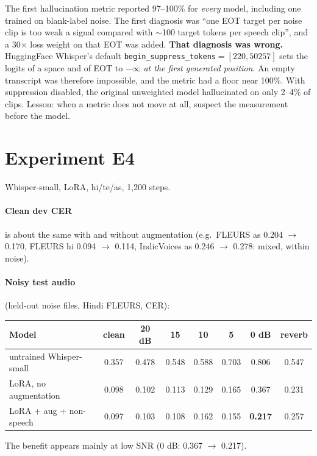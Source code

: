 \begin{vivatip}
The first hallucination metric reported 97--100\% for \emph{every} model, including one trained on blank-label noise. The first
diagnosis was ``one EOT target per noise clip is too weak a signal compared with $\sim$100 target tokens per speech clip'', and a 30$\times$
loss weight on that EOT was added. \textbf{That diagnosis was wrong.} HuggingFace Whisper's default
\texttt{begin\_suppress\_tokens}$=[220, 50257]$ sets the logits of a space and of EOT to $-\infty$ \emph{at the first generated
position}. An empty transcript was therefore impossible, and the metric had a floor near 100\%. With suppression disabled, the
original unweighted model hallucinated on only 2--4\% of clips. Lesson: when a metric does not move at all, suspect the
measurement before the model.
\end{vivatip}

\section{Experiment E4}

Whisper-small, LoRA, hi/te/as, 1{,}200 steps.

\paragraph{Clean dev CER} is about the same with and without augmentation (e.g.\ FLEURS as 0.204 $\to$ 0.170, FLEURS hi 0.094
$\to$ 0.114, IndicVoices as 0.246 $\to$ 0.278: mixed, within noise).

\paragraph{Noisy test audio} (held-out noise files, Hindi FLEURS, CER):
\begin{center}
\begin{tabular}{lccccccc}
\toprule
Model & clean & 20 dB & 15 & 10 & 5 & 0 dB & reverb\\
\midrule
untrained Whisper-small & 0.357 & 0.478 & 0.548 & 0.588 & 0.703 & 0.806 & 0.547\\
LoRA, no augmentation & 0.098 & 0.102 & 0.113 & 0.129 & 0.165 & 0.367 & 0.231\\
LoRA + aug + non-speech & 0.097 & 0.103 & 0.108 & 0.162 & 0.155 & \textbf{0.217} & 0.257\\
\bottomrule
\end{tabular}
\end{center}
The benefit appears mainly at low SNR (0 dB: 0.367 $\to$ 0.217).

